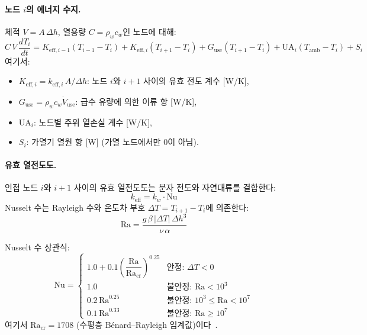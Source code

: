\paragraph{노드 $i$의 에너지 수지.}
체적 $V = A\,\Delta h$, 열용량 $C = \rho_w c_w$인 노드에 대해:
\begin{equation}\label{eq:tank-energy}
  C\,V\,\frac{dT_i}{dt}
  = K_{\text{eff},i-1}(T_{i-1} - T_i)
  + K_{\text{eff},i}(T_{i+1} - T_i)
  + G_\text{use}(T_{i+1} - T_i)
  + \text{UA}_i(T_\text{amb} - T_i)
  + S_i
\end{equation}
여기서:
\begin{itemize}
  \item $K_{\text{eff},i} = k_{\text{eff},i}\,A / \Delta h$: 노드 $i$와 $i+1$ 사이의 유효 전도 계수 [W/K],
  \item $G_\text{use} = \rho_w c_w \dot{V}_\text{use}$: 급수 유량에 의한 이류 항 [W/K],
  \item $\text{UA}_i$: 노드별 주위 열손실 계수 [W/K],
  \item $S_i$: 가열기 열원 항 [W] (가열 노드에서만 0이 아님).
\end{itemize}

\paragraph{유효 열전도도.}
인접 노드 $i$와 $i+1$ 사이의 유효 열전도도는 분자 전도와 자연대류를 결합한다:
\begin{equation}\label{eq:tank-keff}
  k_{\text{eff}} = k_w \cdot \text{Nu}
\end{equation}
Nusselt 수는 Rayleigh 수와 온도차 부호 $\Delta T = T_{i+1} - T_i$에 의존한다:
\begin{equation}\label{eq:tank-Ra}
  \text{Ra} = \frac{g\,\beta\,|\Delta T|\,\Delta h^3}{\nu\,\alpha}
\end{equation}

Nusselt 수 상관식:
\begin{equation}\label{eq:tank-Nu}
  \text{Nu} = \begin{cases}
    1.0 + 0.1\left(\dfrac{\text{Ra}}{\text{Ra}_\text{cr}}\right)^{0.25}
      & \text{안정: } \Delta T < 0 \\[8pt]
    1.0   & \text{불안정: } \text{Ra} < 10^3 \\
    0.2\,\text{Ra}^{0.25} & \text{불안정: } 10^3 \le \text{Ra} < 10^7 \\
    0.1\,\text{Ra}^{0.33} & \text{불안정: } \text{Ra} \ge 10^7
  \end{cases}
\end{equation}
여기서 $\text{Ra}_\text{cr} = 1708$ (수평층 B\'{e}nard--Rayleigh 임계값)이다~\cite{incropera2006}.


